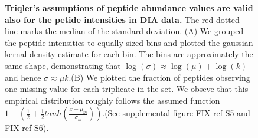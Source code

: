 \documentclass[10pt,letterpaper]{article}
\begin{document}
\begin{figure}[H]
\begin{tabular}{lclc}
    \end{tabular}

        \caption{{\bf Triqler's assumptions of peptide abundance values are valid also for the petide intensities in DIA data.} The red dotted line marks the median of the standard deviation.  (A) We grouped the peptide intensities to equally sized bins and plotted the gaussian kernal density estimate for each bin. The bins are approximately the same shape, demonstrating that $\log(\sigma) \approx \log(\mu) + \log(k)$ and hence   $\sigma \approx \mu k$.(B) We plotted the fraction of peptides observing one missing value for each triplicate in the set. We obseve that this empirical distribution roughly follows the assumed function $1 - (\frac{1}{2} + \frac{1}{2}tanh(\frac{x - \mu_m}{\sigma_m}))$.(See supplemental figure FIX-ref-S5 and FIX-ref-S6).}
      \label{fig:assumptions}
\end{figure}
\end{document}

